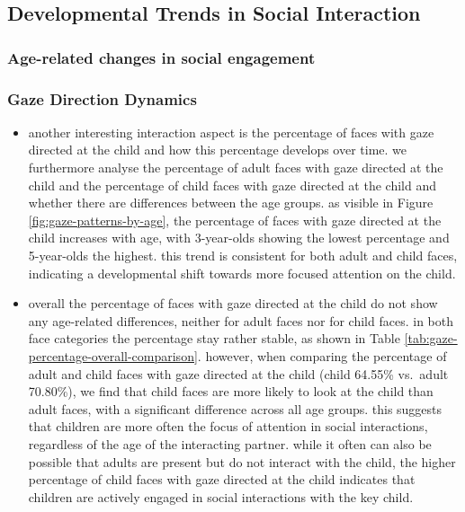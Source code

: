 \documentclass[
  man,floatsintext]{apa6}
\providecommand{\tightlist}{%
  \setlength{\itemsep}{0pt}\setlength{\parskip}{0pt}}
\begin{document}
\subsection{Developmental Trends in Social Interaction}\label{developmental-trends-in-social-interaction}

\subsubsection{Age-related changes in social engagement}\label{age-related-changes-in-social-engagement}

\subsubsection{Gaze Direction Dynamics}\label{gaze-direction-dynamics}

\begin{itemize}
\tightlist
\item
  another interesting interaction aspect is the percentage of faces with gaze directed at the child and how this percentage develops over time. we furthermore analyse the percentage of adult faces with gaze directed at the child and the percentage of child faces with gaze directed at the child and whether there are differences between the age groups. as visible in Figure \ref{fig:gaze-patterns-by-age}, the percentage of faces with gaze directed at the child increases with age, with 3-year-olds showing the lowest percentage and 5-year-olds the highest. this trend is consistent for both adult and child faces, indicating a developmental shift towards more focused attention on the child.
\item
  overall the percentage of faces with gaze directed at the child do not show any age-related differences, neither for adult faces nor for child faces. in both face categories the percentage stay rather stable, as shown in Table \ref{tab:gaze-percentage-overall-comparison}. however, when comparing the percentage of adult and child faces with gaze directed at the child (child 64.55\% vs.~adult 70.80\%), we find that child faces are more likely to look at the child than adult faces, with a significant difference across all age groups. this suggests that children are more often the focus of attention in social interactions, regardless of the age of the interacting partner. while it often can also be possible that adults are present but do not interact with the child, the higher percentage of child faces with gaze directed at the child indicates that children are actively engaged in social interactions with the key child.
\end{itemize}
\end{document}
